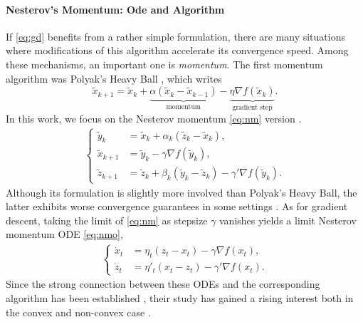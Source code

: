 \documentclass{article}
\newcommand{\jh}[1]{{\color{red} #1}}
\theoremstyle{plain}
\theoremstyle{definition}
\theoremstyle{remark}
\begin{document}
\paragraph{Nesterov's Momentum: Ode and Algorithm \:}
If \eqref{eq:gd} benefits from a rather simple formulation, there are many situations where modifications of this algorithm accelerate its convergence speed. Among these mechanisms, an important one is \textit{momentum}. The first momentum algorithm was Polyak's Heavy Ball \cite{polyak1964some}, which writes
\begin{equation}\label{eq:hb}\tag{HB}
     \tilde x_{k+1} = \tilde x_k + \underbrace{\alpha(\tilde x_k-\tilde x_{k-1})}_{\text{momentum}} - \underbrace{\eta \nabla f(\tilde x_k)}_{\text{gradient step}}.
\end{equation}
In this work, we focus on the Nesterov momentum \eqref{eq:nm} version \cite{nesterovbook}. 
\begin{align}\label{eq:nm}\tag{NM}\left\{
    \begin{array}{ll}
        \tilde{y}_k &= \tilde{x}_k+ \alpha_k(\tilde{z}_{k} - \tilde{x}_k),  \\
        \tilde{x}_{k+1} &=  \tilde{y}_k  - \gamma \nabla f(\tilde{y}_k),\\
        \tilde{z}_{k+1} &=   \tilde{z}_{k} + \beta_k(\tilde{y}_k - \tilde{z}_{k}) - \gamma' \nabla f(\tilde{y}_k).
    \end{array}
\right.
\end{align}
Although its formulation is slightly more involved than Polyak’s Heavy Ball,
the latter exhibits worse convergence guarantees in some settings \cite{ghadimi2015global,goujaud2025provable}.
As for gradient descent, taking the limit of \eqref{eq:nm} as stepsize $\gamma$ vanishes yields a limit Nesterov momentum ODE \eqref{eq:nmo}, \cite[Appendix A.1]{pmlr-v202-kim23y}
\begin{align}\label{eq:nmo}\tag{NMO}\left\{
    \begin{array}{ll}
        \dot{x}_t &= \eta_t(z_t-x_t) - \gamma \nabla f(x_t), \\
        \dot{z}_t &= \eta'_t(x_t-z_t) - \gamma' \nabla f(x_t). 
    \end{array}
\right.
\end{align}
Since the strong connection between these ODEs and the corresponding algorithm has been established \cite{suboydcandes}, their study has gained a rising interest both in the convex \hypertarget{cont_param}{{}} \cite{siegel2021accelerated,shi2018understanding,attouch2020firstorder, aujdossrondPL,li2024linear,guo2024speed} and non-convex case \cite{okamura2024primitive,hermant2024study,guptanesterov,renaud2025provably}. 
\end{document}
